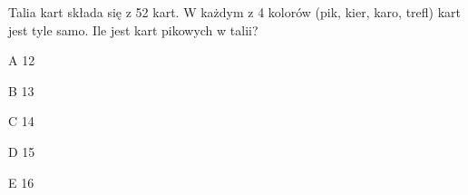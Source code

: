 \begin{tresc}
Talia kart składa się z 52 kart. W każdym z 4 kolorów (pik, kier, karo, trefl) kart jest tyle samo. Ile jest kart pikowych w talii?
\end{tresc}
\begin{wariant}{A} 12 \end{wariant}
\begin{wariant}{B} 13 \end{wariant}
\begin{wariant}{C} 14 \end{wariant}
\begin{wariant}{D} 15 \end{wariant}
\begin{wariant}{E} 16 \end{wariant}
